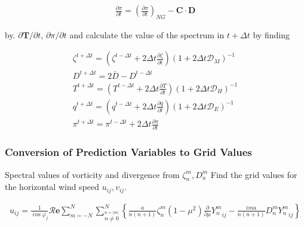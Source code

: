 \begin{eqnarray}
  \frac{\partial \pi}{\partial t} 
      =   \left( \frac{\partial \pi}
                        {\partial t}       \right)_{NG}  
         - \mathbf{C} \cdot \mathbf{D}
\end{eqnarray}

by. \(\partial \mathbf{T}/\partial t\), \(\partial \pi/\partial t\) and
calculate the value of the spectrum in \(t+\Delta t\) by finding

\begin{eqnarray}
  \zeta^{t+\Delta t}  =  \left( \zeta^{t-\Delta t}
                                +   2 \Delta t \frac{\partial \zeta}{\partial t} \right)
                          ( 1 + 2 \Delta t {\mathcal D}_M )^{-1} \\
  D^{t+\Delta t}  =  2 \bar{D} - D^{t-\Delta t}\\
  T^{t+\Delta t}  =  \left( T^{t-\Delta t}
                                +  2 \Delta t  \frac{\partial T}{\partial t} \right)
                          ( 1 + 2 \Delta t {\mathcal D}_H )^{-1} \\
  q^{t+\Delta t}  =  \left( q^{t-\Delta t}
                                +  2 \Delta t \frac{\partial q}{\partial t} \right)
                          ( 1 + 2 \Delta t {\mathcal D}_E )^{-1} \\
\pi^{t+\Delta t}  =  \pi^{t-\Delta t}
                                +  2 \Delta t \frac{\partial \pi}{\partial t}
\end{eqnarray}

\hypertarget{conversion-of-prediction-variables-to-grid-values}{%
\subsubsection{Conversion of Prediction Variables to Grid
Values}\label{conversion-of-prediction-variables-to-grid-values}}

Spectral values of vorticity and divergence from \(\zeta_n^m, D_n^m\)
Find the grid values for the horizontal wind speed \(u_{ij}, v_{ij}\).

\begin{eqnarray}
  u_{ij}
  =  \frac{1}{\cos \varphi_j}
     {\mathcal R}\mathbf{e} \sum_{m=-N}^{N} 
                       \sum_{\stackrel{n=|m|}{n \neq 0}}^{N} 
    \left\{
             \frac{a}{n(n+1)} \zeta_n^m 
            (1-\mu^{2}) \frac{\partial }{\partial \mu} {Y_n^m}_{ij}
          -  \frac{im a}{n(n+1)} D_n^m {Y_n^m}_{ij}
    \right\}
\end{eqnarray}

